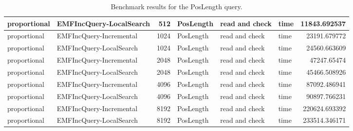 \begin{table}
\begin{tabular}{| l | l | r | l | l | l | r |}
proportional & EMFIncQuery-LocalSearch & 512 & PosLength & read and check & time & 11843.692537\\\hline
proportional & EMFIncQuery-Incremental & 1024 & PosLength & read and check & time & 23191.679772\\\hline
proportional & EMFIncQuery-LocalSearch & 1024 & PosLength & read and check & time & 24560.663609\\\hline
proportional & EMFIncQuery-Incremental & 2048 & PosLength & read and check & time & 47247.65474\\\hline
proportional & EMFIncQuery-LocalSearch & 2048 & PosLength & read and check & time & 45466.508926\\\hline
proportional & EMFIncQuery-Incremental & 4096 & PosLength & read and check & time & 87092.486941\\\hline
proportional & EMFIncQuery-LocalSearch & 4096 & PosLength & read and check & time & 90897.766231\\\hline
proportional & EMFIncQuery-Incremental & 8192 & PosLength & read and check & time & 220624.693392\\\hline
proportional & EMFIncQuery-LocalSearch & 8192 & PosLength & read and check & time & 233514.346171\\\hline

\end{tabular}\caption{Benchmark results for the \textsf{PosLength} query.}
\label{tab:first-validation-poslength}
\end{table}
